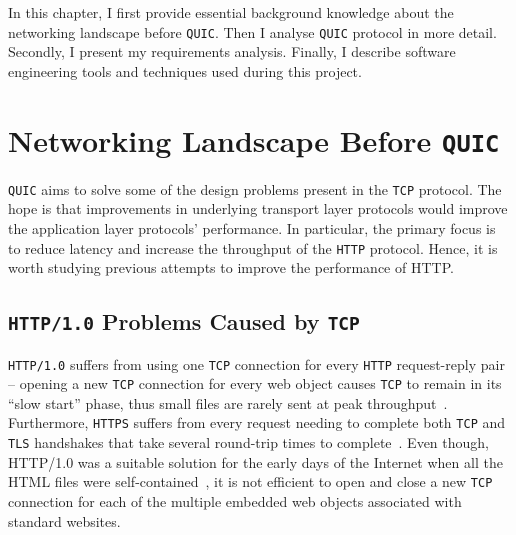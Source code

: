 \documentclass[12pt,a4paper,twoside,openright]{report}
\begin{document}


In this chapter, I first provide essential background knowledge about the networking landscape before \texttt{QUIC}. 
Then I analyse \texttt{QUIC} protocol in more detail.
Secondly, I present my requirements analysis.
Finally, I describe software engineering tools and techniques used during this project.


\section{Networking Landscape Before \texttt{QUIC}} \label{Networking_Landscape_Before_QUIC}
    \texttt{QUIC} aims to solve some of the design problems present in the \texttt{TCP} protocol. The hope is that improvements in underlying transport layer protocols would improve the application layer protocols' performance.
    In particular, the primary focus is to reduce latency and increase the throughput of the \texttt{HTTP} protocol.
    Hence, it is worth studying previous attempts to improve the performance of HTTP.


\subsection{\texttt{HTTP/1.0} Problems Caused by \texttt{TCP}}
    \texttt{HTTP/1.0} suffers from using one \texttt{TCP} connection for every \texttt{HTTP} request-reply pair \cite{TCP_IP_Guide_Book, HTTP_3_the_past_the_present_and_the_future} --
    opening a new \texttt{TCP} connection for every web object causes \texttt{TCP} to remain in its \enquote{slow start} phase, thus small files are rarely sent at peak throughput~\cite{HTTP_3_the_past_the_present_and_the_future}.
    Furthermore, \texttt{HTTPS} suffers from every request needing to complete both \texttt{TCP} and \texttt{TLS} handshakes that take several round-trip times to complete~\cite{HTTP_3_the_past_the_present_and_the_future}.
    Even though, HTTP/1.0 was a suitable solution for the early days of the Internet when all the HTML files were self-contained~\cite{TCP_IP_Guide_Book_2}, it is not efficient to open and close a new \texttt{TCP} connection for each of the multiple embedded web objects associated with standard websites.
\end{document}
